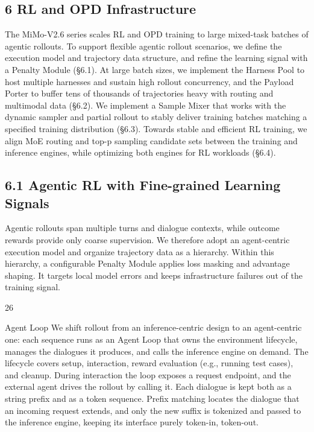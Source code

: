 \documentclass[
  10
]{article}
\begin{document}
\subsection{6 RL and OPD
Infrastructure}\label{rl-and-opd-infrastructure}

The MiMo-V2.6 series scales RL and OPD training to large mixed-task
batches of agentic rollouts. To support flexible agentic rollout
scenarios, we define the execution model and trajectory data structure,
and refine the learning signal with a Penalty Module (§6.1). At large
batch sizes, we implement the Harness Pool to host multiple harnesses
and sustain high rollout concurrency, and the Payload Porter to buffer
tens of thousands of trajectories heavy with routing and multimodal data
(§6.2). We implement a Sample Mixer that works with the dynamic sampler
and partial rollout to stably deliver training batches matching a
specified training distribution (§6.3). Towards stable and efficient RL
training, we align MoE routing and top-p sampling candidate sets between
the training and inference engines, while optimizing both engines for RL
workloads (§6.4).

\subsection{6.1 Agentic RL with Fine-grained Learning
Signals}\label{agentic-rl-with-fine-grained-learning-signals}

Agentic rollouts span multiple turns and dialogue contexts, while
outcome rewards provide only coarse supervision. We therefore adopt an
agent-centric execution model and organize trajectory data as a
hierarchy. Within this hierarchy, a configurable Penalty Module applies
loss masking and advantage shaping. It targets local model errors and
keeps infrastructure failures out of the training signal.

26

Agent Loop We shift rollout from an inference-centric design to an
agent-centric one: each sequence runs as an Agent Loop that owns the
environment lifecycle, manages the dialogues it produces, and calls the
inference engine on demand. The lifecycle covers setup, interaction,
reward evaluation (e.g., running test cases), and cleanup. During
interaction the loop exposes a request endpoint, and the external agent
drives the rollout by calling it. Each dialogue is kept both as a string
prefix and as a token sequence. Prefix matching locates the dialogue
that an incoming request extends, and only the new suffix is tokenized
and passed to the inference engine, keeping its interface purely
token-in, token-out.
\end{document}
